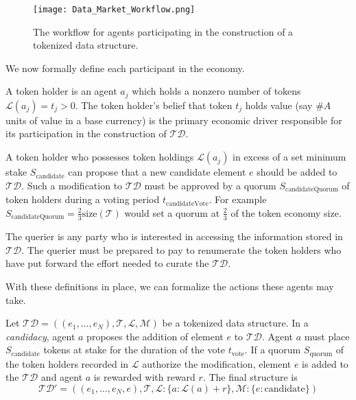 \documentclass{llncs}
\begin{document}
\begin{figure*}
  \centering
  \texttt{[image: Data\_Market\_Workflow.png]}
  \caption{The workflow for agents participating in the construction of a tokenized data structure.}
  \label{fig:tcdiagram}
\end{figure*}

We now formally define each participant in the economy.

\begin{definition}
A token holder is an agent $a_j$ which holds a nonzero number of tokens $\mathcal{L}(a_j) = t_j > 0$. The token holder's belief that token $t_j$ holds value (say $\#A$ units of value in a base currency) is the primary economic driver responsible for its participation in the construction of $\mathcal{TD}$.
\end{definition}

\begin{definition}[Maker]
A token holder who possesses token holdings $\mathcal{L}(a_j)$ in excess of a set minimum stake $S_\text{candidate}$ can propose that a new candidate element $e$ should be added to $\mathcal{TD}$. Such a modification to $\mathcal{TD}$ must be approved by a quorum $S_\text{candidateQuorum}$ of token holders during a voting period $t_\text{candidateVote}$. For example $S_\text{candidateQuorum} = \frac{2}{3}\text{size}(\mathcal{T})$ would set a quorum at $\frac{2}{3}$ of the token economy size.
\end{definition}


\begin{definition}[Querier]
The querier is any party who is interested in accessing the information stored in $\mathcal{TD}$. The querier must be prepared to pay to renumerate the token holders who have put forward the effort needed to curate the $\mathcal{TD}$.
\end{definition}

With these definitions in place, we can formalize the actions these agents may take.

\begin{definition}[Candidacy]
Let $\mathcal{TD} = \left ((e_1,\dotsc, e_N), \mathcal{T}, \mathcal{L}, \mathcal{M} \right )$ be a tokenized data structure. In a \textit{candidacy}, agent $a$ proposes the addition of element $e$ to $\mathcal{TD}$. Agent $a$ must place $S_{\text{candidate}}$ tokens at stake for the duration of the vote $t_\text{vote}$. If a quorum $S_{\text{quorum}}$ of the token holders recorded in $\mathcal{L}$ authorize the modification, element $e$ is added to the $\mathcal{TD}$ and agent $a$ is rewarded with reward $r$. The final structure is 
\begin{equation*}
\mathcal{TD}' = \left((e_1,\dotsc, e_N, e), \mathcal{T}, \mathcal{L}: \{a: \mathcal{L}(a) + r\}, \mathcal{M} : \{e: \textrm{candidate}\}\right )    
\end{equation*}
\end{definition}
\end{document}
